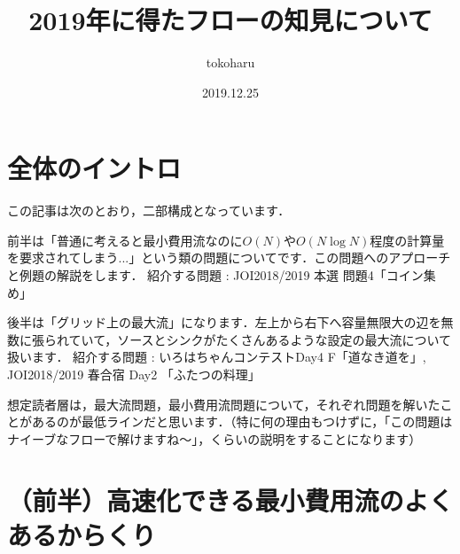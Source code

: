 \documentclass[13pt]{jarticle}
\title{2019年に得たフローの知見について}
\author{tokoharu}
\date {2019.12.25 }
\begin{document}
\maketitle




\section{全体のイントロ}
この記事は次のとおり，二部構成となっています．

前半は「普通に考えると最小費用流なのに$O(N)$や$O(N \log N)$程度の計算量を要求されてしまう...」という類の問題についてです．この問題へのアプローチと例題の解説をします．
紹介する問題 : JOI2018/2019 本選 問題4「コイン集め」

後半は「グリッド上の最大流」になります．左上から右下へ容量無限大の辺を無数に張られていて，ソースとシンクがたくさんあるような設定の最大流について扱います．
紹介する問題 : いろはちゃんコンテストDay4 F「道なき道を」, JOI2018/2019 春合宿 Day2 「ふたつの料理」

想定読者層は，最大流問題，最小費用流問題について，それぞれ問題を解いたことがあるのが最低ラインだと思います．（特に何の理由もつけずに，「この問題はナイーブなフローで解けますね～」，くらいの説明をすることになります）



\section{ （前半）高速化できる最小費用流のよくあるからくり}
\end{document}
